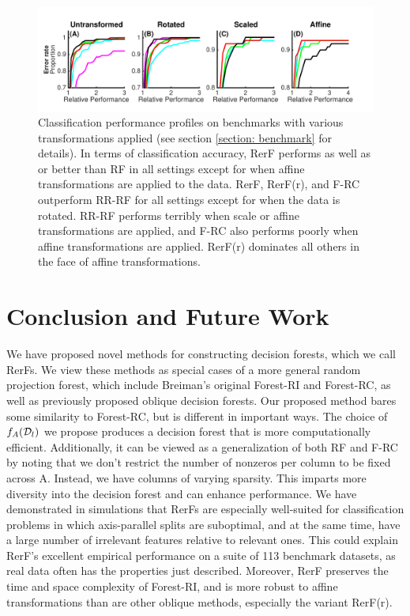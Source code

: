 \documentclass{article}
\begin{document}
\begin{figure}[ht]
\vskip 0.2in
\begin{center}
\centerline{\includegraphics[width=\columnwidth]{Fig4_benchmark}}
\caption{Classification performance profiles on benchmarks with various transformations applied (see section \ref{section: benchmark} for details). In terms of classification accuracy, RerF performs as well as or better than RF in all settings except for when affine transformations are applied to the data. RerF, RerF(r), and F-RC outperform RR-RF for all settings except for when the data is rotated. RR-RF performs terribly when scale or affine transformations are applied, and F-RC also performs poorly when affine transformations are applied. RerF(r) dominates all others in the face of affine transformations.}
\label{benchmark}
\end{center}
\vskip -0.2in
\end{figure}

\section{Conclusion and Future Work}

We have proposed novel methods for constructing decision forests, which we call RerFs. We view these methods as special cases of a more general random projection forest, which include Breiman's original Forest-RI and Forest-RC, as well as previously proposed oblique decision forests. Our proposed method bares some similarity to Forest-RC, but is different in important ways. The choice of $f_A(\mathcal{D}_l)$ we propose produces a decision forest that is more computationally efficient. Additionally, it can be viewed as a generalization of both RF and F-RC by noting that we don't restrict the number of nonzeros per column to be fixed across A. Instead, we have columns of varying sparsity. This imparts more diversity into the decision forest and can enhance performance. We have demonstrated in simulations that RerFs are especially well-suited for classification problems in which axis-parallel splits are suboptimal, and at the same time, have a large number of irrelevant features relative to relevant ones. This could explain RerF's excellent empirical performance on a suite of 113 benchmark datasets, as real data often has the properties just described. Moreover, RerF preserves the time and space complexity of Forest-RI, and is more robust to affine transformations than are other oblique methods, especially the variant RerF(r).
\end{document}
